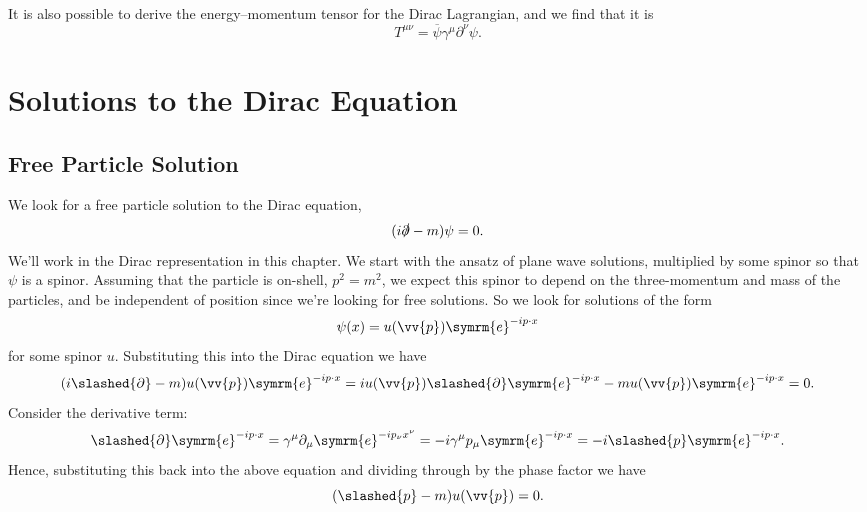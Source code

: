 \documentclass[fleqn]{NotesClass}
\newcommand{\e}{\symrm{e}}
\newcommand{\diracadjoint}[1]{\overbar{#1}}
\begin{document}
    It is also possible to derive the energy--momentum tensor for the Dirac Lagrangian, and we find that it is
    \begin{equation}
        T^{\mu\nu} = \diracadjoint{\psi} \gamma^\mu \partial^\nu \psi.
    \end{equation}
    
    \chapter{Solutions to the Dirac Equation}
    \section{Free Particle Solution}
    We look for a free particle solution to the Dirac equation,
    \begin{equation}
        (i\slashed{\partial} - m) \psi = 0.
    \end{equation}
    We'll work in the Dirac representation in this chapter.
    We start with the ansatz of plane wave solutions, multiplied by some spinor so that \(\psi\) is a spinor.
    Assuming that the particle is on-shell, \(p^2 = m^2\), we expect this spinor to depend on the three-momentum and mass of the particles, and be independent of position since we're looking for free solutions.
    So we look for solutions of the form
    \begin{equation}
        \psi(x) = u(\vv{p}) \e^{-ip\cdot x}
    \end{equation}
    for some spinor \(u\).
    Substituting this into the Dirac equation we have
    \begin{equation}
        (i\slashed{\partial} - m)u(\vv{p})\e^{-ip\cdot x} = iu(\vv{p})\slashed{\partial}\e^{-ip\cdot x} - mu(\vv{p})\e^{-ip\cdot x} = 0.
    \end{equation}
    Consider the derivative term:
    \begin{equation}
        \slashed{\partial}\e^{-ip\cdot x} = \gamma^\mu\partial_\mu \e^{-ip_\nu x^\nu} = -i\gamma^\mu p_\mu\e^{-ip\cdot x} = -i\slashed{p}\e^{-ip\cdot x}.
    \end{equation}
    Hence, substituting this back into the above equation and dividing through by the phase factor we have
    \begin{equation}
        (\slashed{p} - m) u(\vv{p}) = 0.
    \end{equation}
    
\end{document}
